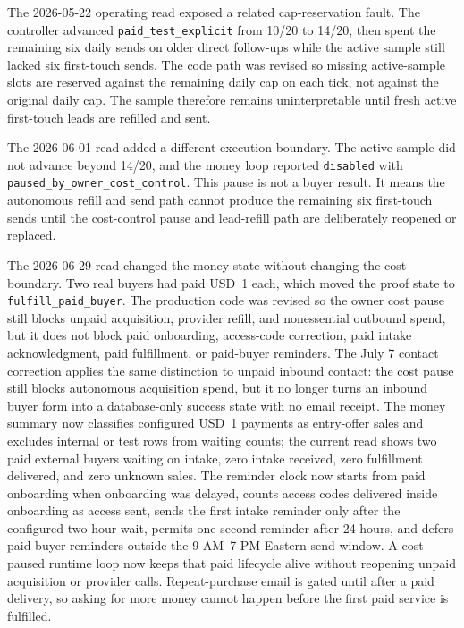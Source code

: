 \documentclass[12pt,letterpaper]{article}
\begin{document}
The 2026-05-22 operating read exposed a related cap-reservation fault. The controller advanced \texttt{paid\_test\_explicit} from 10/20 to 14/20, then spent the remaining six daily sends on older direct follow-ups while the active sample still lacked six first-touch sends. The code path was revised so missing active-sample slots are reserved against the remaining daily cap on each tick, not against the original daily cap. The sample therefore remains uninterpretable until fresh active first-touch leads are refilled and sent.

The 2026-06-01 read added a different execution boundary. The active sample did not advance beyond 14/20, and the money loop reported \texttt{disabled} with \texttt{paused\_by\_owner\_cost\_control}. This pause is not a buyer result. It means the autonomous refill and send path cannot produce the remaining six first-touch sends until the cost-control pause and lead-refill path are deliberately reopened or replaced.

The 2026-06-29 read changed the money state without changing the cost boundary. Two real buyers had paid USD~1 each, which moved the proof state to \texttt{fulfill\_paid\_buyer}. The production code was revised so the owner cost pause still blocks unpaid acquisition, provider refill, and nonessential outbound spend, but it does not block paid onboarding, access-code correction, paid intake acknowledgment, paid fulfillment, or paid-buyer reminders. The July 7 contact correction applies the same distinction to unpaid inbound contact: the cost pause still blocks autonomous acquisition spend, but it no longer turns an inbound buyer form into a database-only success state with no email receipt. The money summary now classifies configured USD~1 payments as entry-offer sales and excludes internal or test rows from waiting counts; the current read shows two paid external buyers waiting on intake, zero intake received, zero fulfillment delivered, and zero unknown sales. The reminder clock now starts from paid onboarding when onboarding was delayed, counts access codes delivered inside onboarding as access sent, sends the first intake reminder only after the configured two-hour wait, permits one second reminder after 24 hours, and defers paid-buyer reminders outside the 9 AM--7 PM Eastern send window. A cost-paused runtime loop now keeps that paid lifecycle alive without reopening unpaid acquisition or provider calls. Repeat-purchase email is gated until after a paid delivery, so asking for more money cannot happen before the first paid service is fulfilled.
\end{document}
